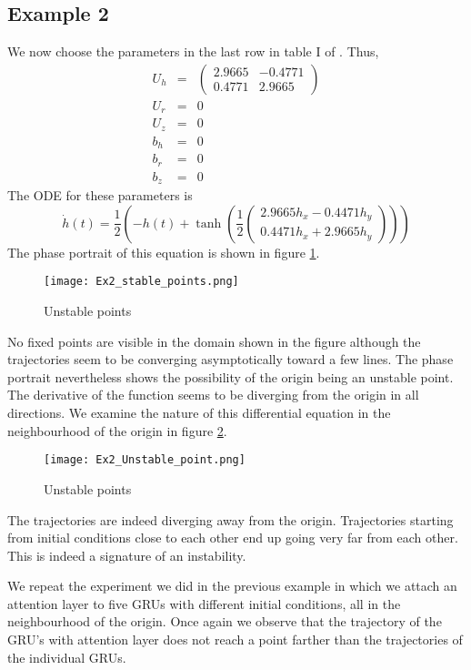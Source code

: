\documentclass{article}
\numberwithin{equation}{section}
\begin{document}
\subsection{Example 2}
We now choose the parameters in the last row in table I of 
\cite{jordan2019gated}. Thus,
\begin{eqnarray}
U_h &=& \begin{pmatrix}2.9665 & -0.4771 \\ 0.4771 & 2.9665\end{pmatrix}
         \label{s11e19} \\
U_r &=& 0 \label{s11e20} \\
U_z &=& 0 \label{s11e21} \\
b_h &=& 0 \label{s11e22} \\
b_r &=& 0 \label{s11e23} \\
b_z &=& 0 \label{s11e24} 
\end{eqnarray}
The ODE for these parameters is
\begin{equation}\label{s11e25}
\dot{h}(t) = \frac{1}{2}\left(-h(t) + \tanh\left(\frac{1}{2} 
\begin{pmatrix}2.9665h_x-0.4471h_y \\0.4471h_x+2.9665h_y\end{pmatrix}\right)
\right)
\end{equation}
The phase portrait of this equation is shown in figure \ref{f5}.
\begin{figure}[!htbp]
\caption{Unstable points}\label{f5}
\texttt{[image: Ex2\_stable\_points.png]}
\centering
\end{figure}
No fixed points are visible in the domain shown in the figure although the
trajectories seem to be converging asymptotically toward a few lines. The
phase portrait nevertheless shows the possibility of the origin being an
unstable point. The derivative of the function seems to be diverging from the
origin in all directions. We examine the nature of this differential equation
in the neighbourhood of the origin in figure \ref{f6}.
\begin{figure}[!htbp]
\caption{Unstable points}\label{f6}
\texttt{[image: Ex2\_Unstable\_point.png]}
\centering
\end{figure}
The trajectories are indeed diverging away from the origin. Trajectories
starting from initial conditions close to each other end up going very far
from each other. This is indeed a signature of an instability.

We repeat the experiment we did in the previous example in which we attach
an attention layer to five GRUs with different initial conditions, all in the
neighbourhood of the origin. Once again we observe that the trajectory of the
GRU's with attention layer does not reach a point farther than the trajectories
of the individual GRUs.
\end{document}
